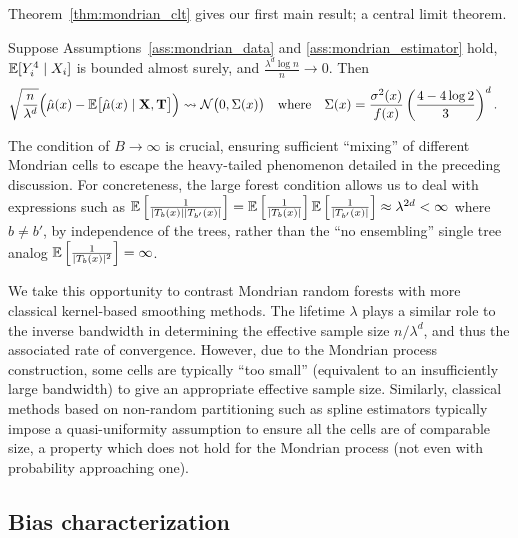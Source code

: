 Theorem~\ref{thm:mondrian_clt} gives our first main result; a central
limit theorem.

\begin{theorem}%
  \label{thm:mondrian_clt}
  Suppose Assumptions~\ref{ass:mondrian_data} and \ref{ass:mondrian_estimator}
  hold,
  $\mathbb{E}[Y_i^4 \mid X_i ]$ is bounded almost surely,
  and $\frac{\lambda^d \log n}{n} \to 0$. Then
  \begin{align*}
    \sqrt{\frac{n}{\lambda^d}}
    \Big( \hat \mu(x) - \mathbb{E} \big[ \hat \mu(x) \mid \mathbf{X}, \mathbf{T} \big] \Big)
    &\rightsquigarrow \mathcal{N}\big(0, \Sigma(x)\big)
    & &\text{where}
    &\Sigma(x) &=
    \frac{\sigma^2(x)}{f(x)} \left( \frac{4 - 4 \log 2}{3 } \right)^d.
  \end{align*}
\end{theorem}

The condition of $B \to \infty$ is crucial, ensuring sufficient ``mixing'' of
different Mondrian cells to escape the heavy-tailed phenomenon detailed in the
preceding discussion. For concreteness, the large forest condition allows us to
deal with expressions such as
$\mathbb{E} \left[ \frac{1}{|T_b(x)| |T_{b'}(x)|} \right]
= \mathbb{E} \left[ \frac{1}{|T_b(x)|} \right] \mathbb{E} \left[ \frac{1}{|T_{b'}(x)|} \right]
\approx \lambda^{2d} < \infty$
where $b \neq b'$, by independence of the trees, rather than the ``no
ensembling'' single tree analog
$\mathbb{E} \left[ \frac{1}{|T_b(x)|^2} \right] = \infty$.

We take this opportunity to contrast Mondrian random forests with more
classical kernel-based smoothing methods. The lifetime $\lambda$ plays a
similar role to the inverse bandwidth in determining the effective sample size
$n / \lambda^d$, and thus the associated rate of convergence. However, due to
the Mondrian process construction, some cells are typically ``too small''
(equivalent to an insufficiently large bandwidth) to give an appropriate
effective sample size. Similarly, classical methods based on non-random
partitioning such as spline estimators \citep{huang2003local,cattaneo2020large}
typically impose a quasi-uniformity assumption to ensure all the cells are of
comparable size, a property which does not hold for the Mondrian process (not
even with probability approaching one).

\subsection*{Bias characterization}

